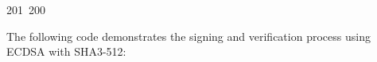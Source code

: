 201~200~\documentclass{article}
\begin{document}
	                                                                                                                                                                                                                                                                                                	                                                                                                                                        	    	                                                                                                	                                                                                                                                                                                                                                                                                                                                	                                                                        	                                                                        	                                                                                                                                        	                                                                                                                                                                                                                        	                                                                                                The following code demonstrates the signing and verification process using ECDSA with SHA3-512:
\end{document}
